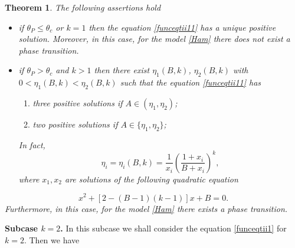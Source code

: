 \documentclass[sn-mathphys]{sn-jnl}%
\theoremstyle{thmstyleone}%
\newtheorem{theorem}{Theorem}%
\theoremstyle{thmstyletwo}%
\theoremstyle{thmstylethree}%
\begin{document}
\begin{theorem}\label{nti} The following assertions hold
 \begin{itemize}
   \item if $\theta_P\leq \theta_c$ or $k=1$ then the equation \eqref{funceqtii11} has a unique positive solution. Moreover, in this case, for the model \eqref{Ham} there does not exist a phase transition.
   \item if $\theta_P>\theta_c$ and $k>1$ then there exist $\eta_1(B,k)$, $\eta_2(B,k)$ with $0<\eta_1(B,k)<\eta_2(B,k)$ such that the equation \eqref{funceqtii11} has
   \begin{enumerate}
     \item three positive solutions if $A\in (\eta_1, \eta_2)$;
     \item two positive solutions if $A\in \{\eta_1, \eta_2\}$;
      \end{enumerate}
   In fact,
 \begin{equation}\label{xi}
 \eta_i=\eta_i(B,k)=\frac{1}{x_i}\left(\frac{1+x_i}{B+x_i}\right)^k,
 \end{equation}
 where $x_1,x_2$ are solutions of the following quadratic equation
 \end{itemize}
 $$x^2+[2-(B-1)(k-1)]x+B=0.$$
 Furthermore, in this case,  for the model \eqref{Ham} there exists a phase transition.
\end{theorem}

\textbf{Subcase $k=2$.}  In this subcase we shall consider the equation \eqref{funceqtii1} for $k=2$. Then we have
\end{document}
